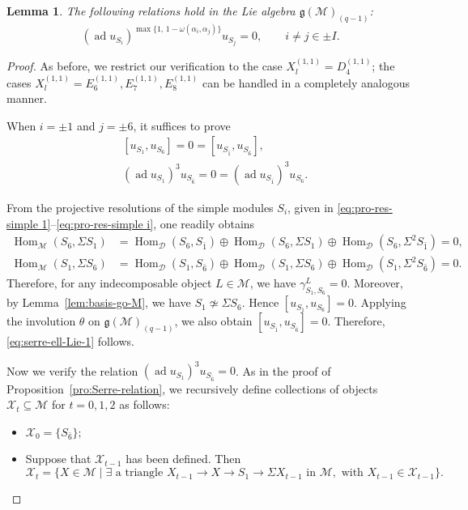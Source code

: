\documentclass[12pt,reqno]{amsart}
\numberwithin{equation}{section}
\newcommand{\Hom}{\operatorname{Hom}\nolimits}
\newtheorem{lemma}[theorem]{Lemma}
\begin{document}
	
	\begin{lemma}\label{lem:ell-serre-relation}
		The following relations hold in the Lie algebra $\mathfrak{g}(\mathcal{M})_{(q-1)}$:
		\[
		(\operatorname{ad} u_{S_i})^{\max\{1,\,1-\omega(\alpha_i,\alpha_j)\}}u_{S_j}=0,\qquad i\ne j\in \pm I. 
		\]
	\end{lemma}
	\begin{proof}
		As before, we restrict our verification to the case $X_l^{(1,1)}=D_4^{(1,1)}$; the cases $X_l^{(1,1)}=E_6^{(1,1)},E_7^{(1,1)},E_8^{(1,1)}$ can be handled in a completely analogous manner.
		
		When $i=\pm1$ and $j=\pm6$, it suffices to prove
		\begin{align}
			& [u_{S_1},u_{S_6}]=0=[u_{S_{\bar 1}},u_{S_{\bar 6}}], \label{eq:serre-ell-Lie-1}\\
			& (\operatorname{ad} u_{S_1})^3 u_{S_{\bar 6}}=0=(\operatorname{ad} u_{S_{\bar 1}})^3 u_{S_6}. \label{eq:serre-ell-Lie-2}
		\end{align}
		
		From the projective resolutions of the simple modules $S_i$, given in \eqref{eq:pro-res-simple 1}--\eqref{eq:pro-res-simple i}, one readily obtains
		\begin{align*}
			\Hom_{\mathcal M}(S_6,\Sigma S_1)
			&=
			\Hom_{\mathcal D}(S_6,S_{\bar 1})
			\oplus
			\Hom_{\mathcal D}(S_6,\Sigma S_1)\oplus \Hom_{\mathcal D}(S_6,\Sigma^2 S_{\bar{1}})
			=0, \\
			\Hom_{\mathcal M}(S_1,\Sigma S_6)
			&=
			\Hom_{\mathcal D}(S_1,S_{\bar 6})
			\oplus
			\Hom_{\mathcal D}(S_1,\Sigma S_6)\oplus \Hom_{\mathcal D}(S_1,\Sigma^2 S_{\bar 6})
			=0.
		\end{align*}
		Therefore, for any indecomposable object $L\in\mathcal M$, we have
		$\gamma_{S_1,S_6}^L=0$. Moreover, by Lemma~\ref{lem:basis-go-M},
		we have $S_1\not\simeq \Sigma S_6$. Hence
		$[u_{S_1},u_{S_6}]=0$. Applying the involution $\theta$ on
		$\mathfrak{g}(\mathcal{M})_{(q-1)}$, we also obtain
		$[u_{S_{\bar 1}},u_{S_{\bar 6}}]=0$. Therefore,
		\eqref{eq:serre-ell-Lie-1} follows.
		
		Now we verify the relation $(\operatorname{ad} u_{S_1})^3 u_{S_{\bar 6}}=0$. As in the proof of Proposition~\ref{pro:Serre-relation}, we recursively define collections of objects $\mathcal{X}_t\subseteq \mathcal{M}$ for $t=0,1,2$ as follows:
		\begin{itemize}
			\item $\mathcal{X}_0=\{S_{\bar 6}\}$;
			\item Suppose that $\mathcal{X}_{t-1}$ has been defined. Then
			\[
			\mathcal{X}_t=\{X\in \mathcal{M}\mid \exists\text{ a triangle } X_{t-1}\rightarrow X\rightarrow S_1\rightarrow \Sigma X_{t-1} \text{ in } \mathcal{M}, \text{ with } X_{t-1}\in \mathcal{X}_{t-1}\}.  
			\]
		\end{itemize}
		

\end{proof}
\end{document}
